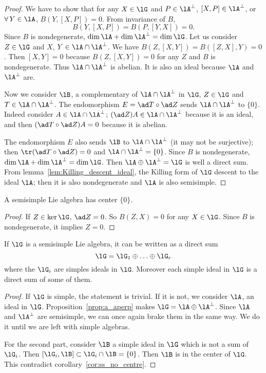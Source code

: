 \begin{proof}
We have to show that for any $X\in\lG$ and $P\in\lA^{\perp}$, $[X,P]\in\lA^{\perp}$, or $\forall\, Y\in\lA$, $B(Y,[X,P])=0$. From invariance of $B$,
\[
  B(Y,[X,P])=B(P,[Y,X])=0.
\]
Since $B$ is nondegenerate, $\dim\lA+\dim\lA^{\perp}=\dim\lG$. Let us consider $Z\in\lG$ and $X$, $Y\in\lA\cap\lA^{\perp}$. We have $B(Z,[X,Y])=B([Z,X],Y)=0$. Then $[X,Y]=0$ because $B(Z,[X,Y])=0$ for any $Z$ and $B$ is nondegenerate. Thus $\lA\cap\lA^{\perp}$ is abelian. It is also an ideal because $\lA$ and $\lA^{\perp}$ are.

Now we consider $\lB$, a complementary of $\lA\cap\lA^{\perp}$ in $\lG$, $Z\in\lG$ and $T\in\lA\cap\lA^{\perp}$. The endomorphism $E=\ad T\circ\ad Z$ sends $\lA\cap\lA^{\perp}$ to $\{0\}$. Indeed consider $A\in\lA\cap\lA^{\perp}$; $(\ad Z) A\in\lA\cap\lA^{\perp}$ because it is an ideal, and then $(\ad T\circ\ad Z)A=0$ because it is abelian.

The endomorphism $E$ also sends $\lB$ to $\lA\cap\lA^{\perp}$ (it may not be surjective); then $\tr(\ad T\circ\ad Z)=0$ and $\lA\cap\lA^{\perp}=\{0\}$. Since $B$ is nondegenerate, $\dim\lA+\dim\lA^{\perp}=\dim\lG$. Then $\lA\oplus\lA^{\perp}=\lG$ is well a direct sum.
From lemma~\ref{lem:Killing_descent_ideal}, the Killing form of $\lG$ descent to the ideal $\lA$; then it is also nondegenerate and $\lA$ is also semisimple.
 \end{proof}

\begin{corollary}
A semisimple Lie algebra has center $\{0\}$.
\label{cor:ss_no_centre}
\end{corollary}

\begin{proof}
If $Z\in\ker\lG$, $\ad Z=0$. So $B(Z,X)=0$ for any $X\in\lG$. Since $B$ is nondegenerate, it implies $Z=0$.
\end{proof}


\begin{corollary}
If $\lG$ is a semisimple Lie algebra, it can be written as a direct sum
\[
   \lG=\lG_1\oplus\ldots\oplus\lG_r
\]
where the $\lG_i$ are simples ideals in $\lG$. Moreover each simple ideal in $\lG$ is a direct sum of some of them.
\label{cor:decomp_ideal}
\end{corollary}

\begin{proof}
If $\lG$ is simple, the statement is trivial. If it is not, we consider $\lA$, an ideal in $\lG$.
Proposition~\ref{prop:a_aperp} makes $\lG=\lA\oplus\lA^{\perp}$. Since $\lA$ and $\lA^{\perp}$ are semisimple, we can once again brake them in the same way. We do it until we are left with simple algebras.

For the second part, consider $\lB$ a simple ideal in $\lG$ which is not a sum of $\lG_i$. Then $[\lG_i,\lB]\subset\lG_i\cap\lB=\{0\}$. Then $\lB$ is in the center of $\lG$. This contradict corollary~\ref{cor:ss_no_centre}.
\end{proof}


